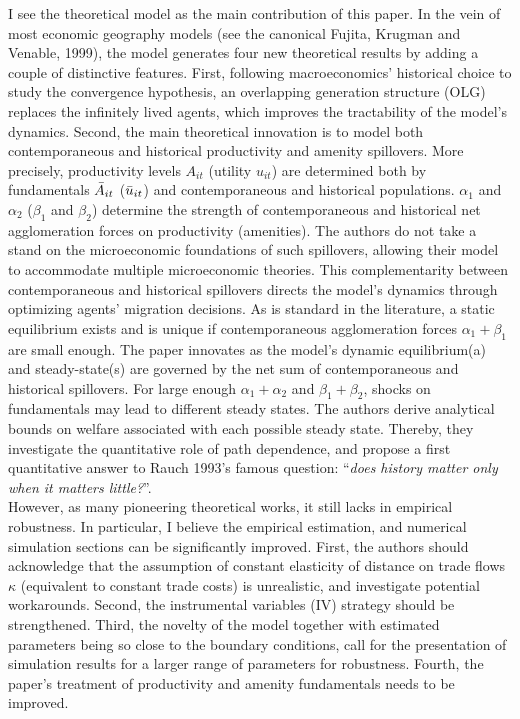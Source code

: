 \documentclass[10pt, final]{article}
\begin{document}
I see the theoretical model as the main contribution of this paper. In the vein of most economic geography models (see the canonical Fujita, Krugman and Venable, 1999), the model generates four new theoretical results by adding a couple of distinctive features.
First, following macroeconomics' historical choice to study the convergence hypothesis, an overlapping generation structure (OLG) replaces the infinitely lived agents, which improves the tractability of the model's dynamics.
Second, the main theoretical innovation is to model both contemporaneous and historical productivity and amenity spillovers. More precisely, productivity levels $A_{it}$ (utility $u_{it}$) are determined both by fundamentals $\Bar{A}_{it}$ ($\Bar{u}_{it}$) and contemporaneous and historical populations. $\alpha_1$ and $\alpha_2$ ($\beta_1$ and $\beta_2$) determine the strength of contemporaneous and historical net agglomeration forces on productivity (amenities).
The authors do not take a stand on the microeconomic foundations of such spillovers, allowing their model to accommodate multiple microeconomic theories.
%
This complementarity between contemporaneous and historical spillovers directs the model's dynamics through optimizing agents' migration decisions. 
As is standard in the literature, a static equilibrium exists and is unique if contemporaneous agglomeration forces $\alpha_1 + \beta_1$ are small enough. 
%
The paper innovates as the model's dynamic equilibrium(a) and steady-state(s) are governed by the net sum of contemporaneous and historical spillovers.
%
For large enough $\alpha_1 + \alpha_2$ and $\beta_1 + \beta_2$, shocks on fundamentals may lead to different steady states. The authors derive analytical bounds on welfare associated with each possible steady state. Thereby, they investigate the quantitative role of path dependence, and propose a first quantitative answer to Rauch 1993's famous question: ``\textit{does history matter only when it matters little?}''.
\\


However, as many pioneering theoretical works, it still lacks in empirical robustness.
In particular, I believe the empirical estimation, and numerical simulation sections can be significantly improved. 
First, the authors should acknowledge that the assumption of constant elasticity of distance on trade flows $\kappa$ (equivalent to constant trade costs) is unrealistic, and investigate potential workarounds. 
Second, the instrumental variables (IV) strategy should be strengthened. 
Third, the novelty of the model together with estimated parameters being so close to the boundary conditions, call for the presentation of simulation results for a larger range of parameters for robustness.
%
Fourth, the paper's treatment of productivity and amenity fundamentals needs to be improved.
\\
\end{document}
